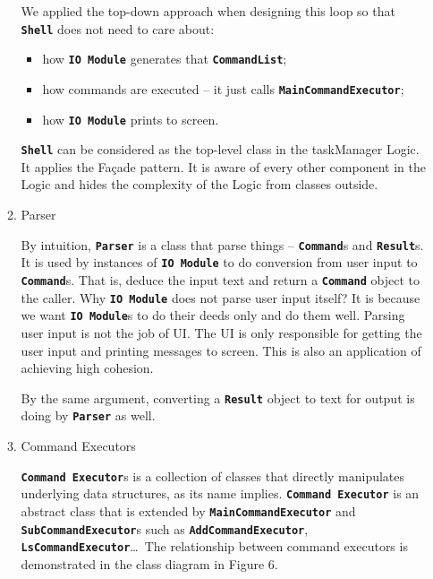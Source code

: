 \documentclass[12pt, a4paper]{article}
\newcommand{\cmdinline}[1]{{\bf \texttt{#1}}}
\begin{document}
\begin{enumerate}
\begin{enumerate}
We applied the top-down approach when designing this loop so that \cmdinline{Shell} does not need to care about:
\begin{itemize}
\item how \cmdinline{IO Module} generates that \cmdinline{CommandList};
\item how commands are executed -- it just calls \cmdinline{MainCommandExecutor};
\item how \cmdinline{IO Module} prints to screen.
\end{itemize}

\cmdinline{Shell} can be considered as the top-level class in the taskManager Logic. It applies the Fa\c cade pattern. It is aware of every other component in the Logic and hides the complexity of the Logic from classes outside.

\item Parser

By intuition, \cmdinline{Parser} is a class that parse things -- \cmdinline{Command}s and \cmdinline{Result}s. It is used by instances of \cmdinline{IO Module} to do conversion from user input to \cmdinline{Command}s. That is, deduce the input text and return a \cmdinline{Command} object to the caller.
Why \cmdinline{IO Module} does not parse user input itself? It is because we want \cmdinline{IO Module}s to do their deeds only and do them well. Parsing user input is not the job of UI. The UI is only responsible for getting the user input and printing messages to screen. This is also an application of achieving high cohesion.

By the same argument, converting a \cmdinline{Result} object to text for output is doing by \cmdinline{Parser} as well.

\item Command Executors

\cmdinline{Command Executor}s is a collection of classes that directly manipulates underlying data structures, as its
name implies. \cmdinline{Command Executor} is an abstract class that is extended by \cmdinline{MainCommandExecutor} and \cmdinline{SubCommandExecutor}s such as \cmdinline{AddCommandExecutor}, \cmdinline{LsCommandExecutor}\footnotemark\ldots \ The relationship between command executors is demonstrated in the  class diagram in Figure 6.


\end{enumerate}
\end{enumerate}
\end{document}
